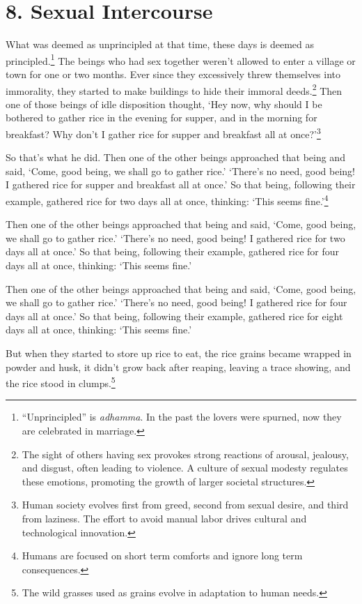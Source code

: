 \documentclass[12pt,openany]{book}%
\begin{document}
\section*{8. Sexual Intercourse }

What was deemed as unprincipled at that time, these days is deemed as principled.\footnote{“Unprincipled” is \textit{adhamma}. In the past the lovers were spurned, now they are celebrated in marriage. } The beings who had sex together weren’t allowed to enter a village or town for one or two months. Ever since they excessively threw themselves into immorality, they started to make buildings to hide their immoral deeds.\footnote{The sight of others having sex provokes strong reactions of arousal, jealousy, and disgust, often leading to violence. A culture of sexual modesty regulates these emotions, promoting the growth of larger societal structures. } Then one of those beings of idle disposition thought, ‘Hey now, why should I be bothered to gather rice in the evening for supper, and in the morning for breakfast? Why don’t I gather rice for supper and breakfast all at once?’\footnote{Human society evolves first from greed, second from sexual desire, and third from laziness. The effort to avoid manual labor drives cultural and technological innovation. } 

So that’s what he did. Then one of the other beings approached that being and said, ‘Come, good being, we shall go to gather rice.’ ‘There’s no need, good being! I gathered rice for supper and breakfast all at once.’ So that being, following their example, gathered rice for two days all at once, thinking: ‘This seems fine.’\footnote{Humans are focused on short term comforts and ignore long term consequences. } 

Then one of the other beings approached that being and said, ‘Come, good being, we shall go to gather rice.’ ‘There’s no need, good being! I gathered rice for two days all at once.’ So that being, following their example, gathered rice for four days all at once, thinking: ‘This seems fine.’ 

Then one of the other beings approached that being and said, ‘Come, good being, we shall go to gather rice.’ ‘There’s no need, good being! I gathered rice for four days all at once.’ So that being, following their example, gathered rice for eight days all at once, thinking: ‘This seems fine.’ 

But when they started to store up rice to eat, the rice grains became wrapped in powder and husk, it didn’t grow back after reaping, leaving a trace showing, and the rice stood in clumps.\footnote{The wild grasses used as grains evolve in adaptation to human needs. } 
\end{document}
